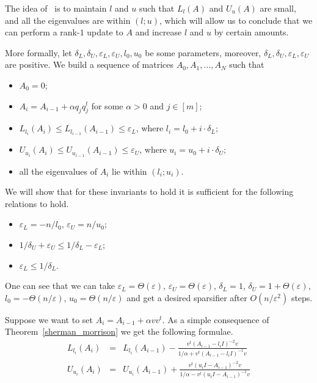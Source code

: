 \documentclass[12pt]{article}
\newcommand{\eps}{\varepsilon}
\begin{document}
    The idea of~\cite{BSS09} is to maintain $l$ and $u$ such that $L_l(A)$ and $U_u(A)$ are small, and all the eigenvalues are
    within $(l; u)$, which will allow us
    to conclude that we can perform a rank-$1$ update to $A$ and increase $l$ and $u$ by certain amounts.

    More formally, let $\delta_L, \delta_U, \eps_L, \eps_U, l_0, u_0$ be some parameters, moreover,
    $\delta_L, \delta_U, \eps_L, \eps_U$ are positive.
    We build a sequence of matrices $A_0, A_1, \ldots, A_N$ such that
    \begin{itemize}
        \item $A_0 = 0$;
        \item $A_i = A_{i-1} + \alpha q_j q_j^t$ for some $\alpha > 0$ and $j \in [m]$;
        \item $L_{l_i}(A_i) \leq L_{l_{i-1}}(A_{i-1}) \leq \eps_L$, where $l_i = l_0 + i \cdot \delta_L$;
        \item $U_{u_i}(A_i) \leq U_{u_{i-1}}(A_{i-1}) \leq \eps_U$, where $u_i = u_0 + i \cdot \delta_U$;
        \item all the eigenvalues of $A_i$ lie within $(l_i; u_i)$.
    \end{itemize}
    We will show that for these invariants to hold it is sufficient for the following relations to hold.
    \begin{itemize}
        \item $\eps_L = -n / l_0$, $\eps_U = n / u_0$;
        \item $1 / \delta_U + \eps_U \leq 1 / \delta_L - \eps_L$;
        \item $\eps_L \leq 1 / \delta_L$.
    \end{itemize}
    One can see that we can take $\eps_L = \Theta(\eps)$, $\eps_U = \Theta(\eps)$, $\delta_L = 1$,
    $\delta_U = 1 + \Theta(\eps)$, $l_0 = -\Theta(n / \eps)$, $u_0 = \Theta(n / \eps)$ and get a desired sparsifier
    after $O(n / \eps^2)$ steps.

    Suppose we want to set $A_i = A_{i-1} + \alpha vv^t$. As a simple consequence of Theorem~\ref{sherman_morrison} we
    get the following formulae.
    \begin{eqnarray*}
        L_{l_i}(A_i) &=& L_{l_i}(A_{i-1}) - \frac{v^t (A_{i-1} - l_iI)^{-2} v}{1 / \alpha + v^t (A_{i-1} - l_i I)^{-1} v}\\
        U_{u_i}(A_i) &=& U_{u_i}(A_{i-1}) + \frac{v^t (u_iI - A_{i-1})^{-2} v}{1 / \alpha - v^t (u_iI - A_{i-1})^{-1} v}\\
    \end{eqnarray*}
\end{document}
